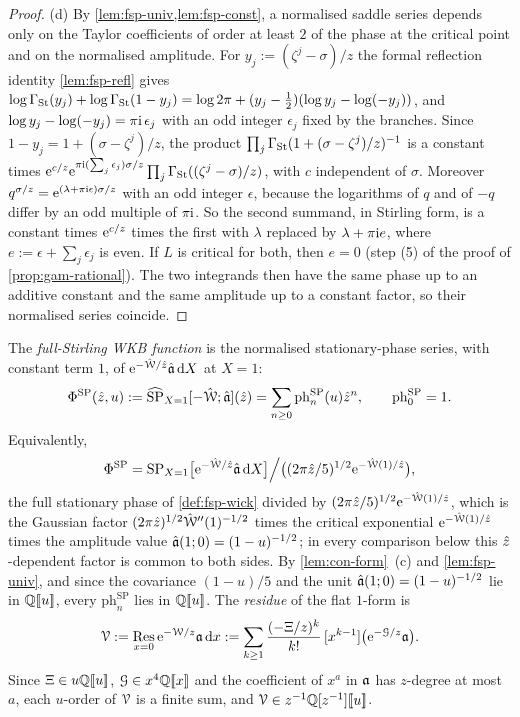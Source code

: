 \begin{proof}
(d) By \cref{lem:fsp-univ,lem:fsp-const}, a normalised saddle series depends only on the Taylor coefficients of order at least $2$ of the phase at the critical point and on the normalised amplitude. For $y_j:=(\zeta^j-\sigma)/z$ the formal reflection identity \cref{lem:fsp-refl} gives $\log\Gamma_{\mathrm{St}}(y_j)+\log\Gamma_{\mathrm{St}}(1-y_j)=\log2\pi+(y_j-\frac12)(\log y_j-\log(-y_j))$, and $\log y_j-\log(-y_j)=\pi\mathrm{i}\,\epsilon_j$ with an odd integer $\epsilon_j$ fixed by the branches. Since $1-y_j=1+(\sigma-\zeta^j)/z$, the product $\prod_j\Gamma_{\mathrm{St}}(1+(\sigma-\zeta^j)/z)^{-1}$ is a constant times $\mathrm{e}^{c/z}\mathrm{e}^{\pi\mathrm{i}(\sum_j\epsilon_j)\sigma/z}\prod_j\Gamma_{\mathrm{St}}((\zeta^j-\sigma)/z)$, with $c$ independent of $\sigma$. Moreover $q^{\sigma/z}=\mathrm{e}^{(\lambda+\pi\mathrm{i}\epsilon)\sigma/z}$ with an odd integer $\epsilon$, because the logarithms of $q$ and of $-q$ differ by an odd multiple of $\pi\mathrm{i}$. So the second summand, in Stirling form, is a constant times $\mathrm{e}^{c/z}$ times the first with $\lambda$ replaced by $\lambda+\pi\mathrm{i} e$, where $e:=\epsilon+\sum_j\epsilon_j$ is even. If $L$ is critical for both, then $e=0$ (step (5) of the proof of \cref{prop:gam-rational}). The two integrands then have the same phase up to an additive constant and the same amplitude up to a constant factor, so their normalised series coincide.
\end{proof}

\begin{defn}
\label{def:con-PhiSP}
The \emph{full-Stirling WKB function} is the normalised stationary-phase series, with constant term $1$, of $\mathrm{e}^{-\hat{\mathcal{W}}/\hat{z}}\hat{\mathfrak{a}}\,\mathrm{d} X$ at $X=1$:
\[
\Phi^{\mathrm{SP}}(\hat{z},u):=\widehat{\mathrm{SP}}_{X=1}[-\hat{\mathcal{W}};\hat{\mathfrak{a}}](\hat{z})=\sum_{n\geq0}\mathrm{ph}^{\mathrm{SP}}_n(u)\hat{z}^n,\qquad\mathrm{ph}^{\mathrm{SP}}_0=1 .
\]
Equivalently,
\[
\Phi^{\mathrm{SP}}=\mathrm{SP}_{X=1}\bigl[\mathrm{e}^{-\hat{\mathcal{W}}/\hat{z}}\hat{\mathfrak{a}}\,\mathrm{d} X\bigr]\Big/\bigl((2\pi\hat{z}/5)^{1/2}\mathrm{e}^{-\hat{\mathcal{W}}(1)/\hat{z}}\bigr),
\]
the full stationary phase of \cref{def:fsp-wick} divided by $(2\pi\hat{z}/5)^{1/2}\mathrm{e}^{-\hat{\mathcal{W}}(1)/\hat{z}}$, which is the Gaussian factor $(2\pi\hat{z})^{1/2}\hat{\mathcal{W}}''(1)^{-1/2}$ times the critical exponential $\mathrm{e}^{-\hat{\mathcal{W}}(1)/\hat{z}}$ times the amplitude value $\hat{\mathfrak{a}}(1;0)=(1-u)^{-1/2}$; in every comparison below this $\hat{z}$-dependent factor is common to both sides. By \cref{lem:con-form}~(c) and \cref{lem:fsp-univ}, and since the covariance $(1-u)/5$ and the unit $\hat{\mathfrak{a}}(1;0)=(1-u)^{-1/2}$ lie in $\mathbb{Q}[\![ u ]\!]$, every $\mathrm{ph}^{\mathrm{SP}}_n$ lies in $\mathbb{Q}[\![ u ]\!]$. The \emph{residue} of the flat $1$-form is
\[
\mathcal{V}:=\operatorname*{Res}_{x=0}\mathrm{e}^{-\mathcal{W}/z}\mathfrak{a}\,\mathrm{d} x:=\sum_{k\geq1}\frac{(-\Xi/z)^k}{k!}\,[x^{k-1}]\bigl(\mathrm{e}^{-\mathcal{G}/z}\mathfrak{a}\bigr).
\]
Since $\Xi\in u\mathbb{Q}[\![ u ]\!]$, $\mathcal{G}\in x^4\mathbb{Q}[\![ x ]\!]$ and the coefficient of $x^a$ in $\mathfrak{a}$ has $z$-degree at most $a$, each $u$-order of $\mathcal{V}$ is a finite sum, and $\mathcal{V}\in z^{-1}\mathbb{Q}[z^{-1}][\![ u ]\!]$.
\end{defn}

